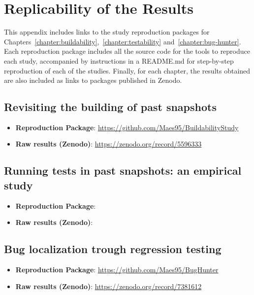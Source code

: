 \chapter{Replicability of the Results}
\label{appendix:replicability}

This appendix includes links to the study reproduction packages for Chapters~\ref{chapter:buildability},~\ref{chapter:testability} and~\ref{chapter:bug-hunter}. 
Each reproduction package includes all the source code for the tools to reproduce each study, accompanied by instructions in a README.md for step-by-step reproduction of each of the studies. 
Finally, for each chapter, the results obtained are also included as links to packages published in Zenodo.

\section{Revisiting the building of past snapshots}
\label{sec:buildability:repro}

\begin{itemize}[]
    \item \textbf{Reproduction Package}: \url{https://github.com/Maes95/BuildabilityStudy}
    \item \textbf{Raw results (Zenodo)}: \url{https://zenodo.org/record/5596333}
\end{itemize}

\section{Running tests in past snapshots: an empirical study}
\label{sec:testability:repro}

\begin{itemize}[]
    \item \textbf{Reproduction Package}: \url{}
    \item \textbf{Raw results (Zenodo)}: \url{}
\end{itemize}

\section{Bug localization trough regression testing}
\label{sec:bug-hunter:repro}

\begin{itemize}[]
    \item \textbf{Reproduction Package}: \url{https://github.com/Maes95/BugHunter}
    \item \textbf{Raw results (Zenodo)}: \url{https://zenodo.org/record/7381612}
\end{itemize}